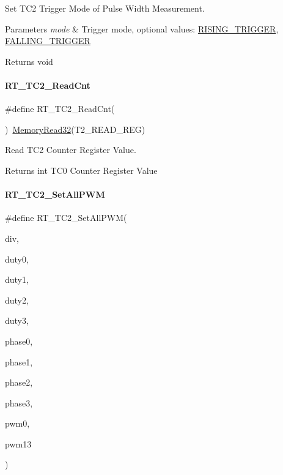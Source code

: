 Set T\+C2 Trigger Mode of Pulse Width Measurement. 


\begin{DoxyParams}{Parameters}
{\em mode} & Trigger mode, optional values\+: \mbox{\hyperlink{a00020_a6d33f21be3f0c5cf91c5d638e8aca086a60a109ab1ab372f4e3935064a3f0a26c}{R\+I\+S\+I\+N\+G\+\_\+\+T\+R\+I\+G\+G\+ER}}, \mbox{\hyperlink{a00020_a6d33f21be3f0c5cf91c5d638e8aca086a75134708fc2093222ca5a56acefc5d3f}{F\+A\+L\+L\+I\+N\+G\+\_\+\+T\+R\+I\+G\+G\+ER}} \\
\hline
\end{DoxyParams}
\begin{DoxyReturn}{Returns}
void 
\end{DoxyReturn}
\mbox{\label{a00047_a6591a513f367f6e7be0a90cb72aa3d49}} 
\paragraph{\texorpdfstring{R\+T\+\_\+\+T\+C2\+\_\+\+Read\+Cnt}{RT\_TC2\_ReadCnt}}
{\footnotesize\ttfamily \#define R\+T\+\_\+\+T\+C2\+\_\+\+Read\+Cnt(\begin{DoxyParamCaption}{ }\end{DoxyParamCaption})~\mbox{\hyperlink{a00020_a706b02571285f92589fbb0b964d7d0bb}{Memory\+Read32}}(T2\+\_\+\+R\+E\+A\+D\+\_\+\+R\+EG)}



Read T\+C2 Counter Register Value. 

\begin{DoxyReturn}{Returns}
int T\+C0 Counter Register Value 
\end{DoxyReturn}
\mbox{\label{a00047_a49e7120e90142442bdd0744f61b572a5}} 
\paragraph{\texorpdfstring{R\+T\+\_\+\+T\+C2\+\_\+\+Set\+All\+P\+WM}{RT\_TC2\_SetAllPWM}}
{\footnotesize\ttfamily \#define R\+T\+\_\+\+T\+C2\+\_\+\+Set\+All\+P\+WM(\begin{DoxyParamCaption}\item[{}]{div,  }\item[{}]{duty0,  }\item[{}]{duty1,  }\item[{}]{duty2,  }\item[{}]{duty3,  }\item[{}]{phase0,  }\item[{}]{phase1,  }\item[{}]{phase2,  }\item[{}]{phase3,  }\item[{}]{pwm0,  }\item[{}]{pwm13 }\end{DoxyParamCaption})}

